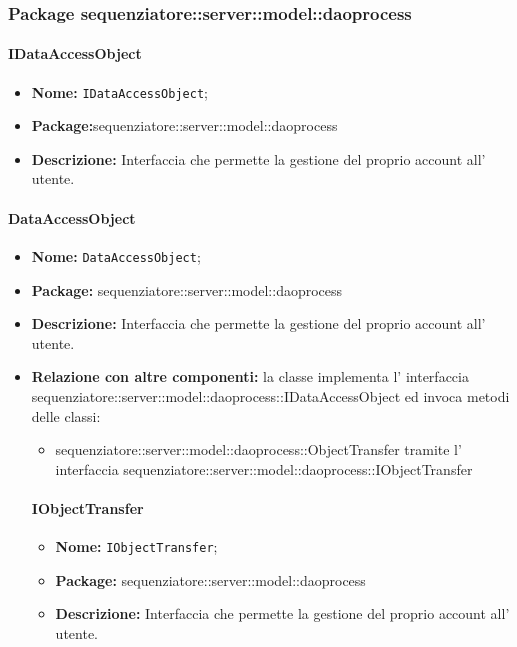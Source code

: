 \begin{itemize}
\subsubsection{Package sequenziatore::server::model::daoprocess}
\paragraph{IDataAccessObject}
	\begin{itemize}
		\item \textbf{Nome:} \texttt{IDataAccessObject};
		\item \textbf{Package:}sequenziatore::server::model::daoprocess
		\item \textbf{Descrizione:} Interfaccia che permette la gestione del proprio account all' utente.
	\end{itemize}
\paragraph{DataAccessObject}
	\begin{itemize}
		\item \textbf{Nome:} \texttt{DataAccessObject};
		\item \textbf{Package:} sequenziatore::server::model::daoprocess
		\item \textbf{Descrizione:} Interfaccia che permette la gestione del proprio account all' utente.
		\item \textbf{Relazione con altre componenti:} la classe implementa l' interfaccia sequenziatore::server::model::daoprocess::IDataAccessObject ed invoca metodi delle classi:
		\begin{itemize}
			\item sequenziatore::server::model::daoprocess::ObjectTransfer tramite l' interfaccia sequenziatore::server::model::daoprocess::IObjectTransfer
	\end{itemize}
\paragraph{IObjectTransfer}
	\begin{itemize}
		\item \textbf{Nome:} \texttt{IObjectTransfer};
		\item \textbf{Package:} sequenziatore::server::model::daoprocess
		\item \textbf{Descrizione:} Interfaccia che permette la gestione del proprio account all' utente.
	\end{itemize}

\end{itemize}
\end{itemize}
